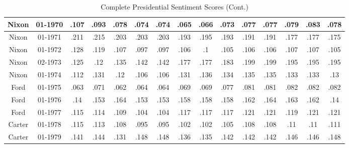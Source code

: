 \begin{sidewaystable}
\begin{singlespace}
\begin{center}
\begin{tabular}{||c c c c c c c c c c c c c c c||}
\hline
Nixon & 01-1970 & .107 & .093 & .078 & .074 & .074 & .065 & .066 & .073 & .077 & .077 & .079 & .083 & .078 \\ 
\hline
Nixon & 01-1971 & .211 & .215 & .203 & .203 & .203 & .193 & .195 & .193 & .191 & .191 & .177 & .177 & .175 \\ 
\hline
Nixon & 01-1972 & .128 & .119 & .107 & .097 & .097 & .106 & .1 & .105 & .106 & .106 & .107 & .107 & .105 \\ 
\hline
Nixon & 02-1973 & .125 & .12 & .135 & .142 & .142 & .177 & .177 & .183 & .199 & .199 & .195 & .195 & .195 \\ 
\hline
Nixon & 01-1974 & .112 & .131 & .12 & .106 & .106 & .131 & .136 & .134 & .135 & .135 & .133 & .133 & .13 \\ 
\hline
Ford & 01-1975 & .063 & .071 & .062 & .064 & .064 & .069 & .069 & .077 & .081 & .081 & .082 & .082 & .082 \\ 
\hline
Ford & 01-1976 & .14 & .153 & .164 & .153 & .153 & .158 & .158 & .158 & .162 & .164 & .163 & .162 & .14 \\ 
\hline
Ford & 01-1977 & .115 & .114 & .109 & .104 & .104 & .117 & .117 & .117 & .121 & .121 & .119 & .121 & .121 \\ 
\hline
Carter & 01-1978 & .115 & .113 & .108 & .095 & .095 & .102 & .102 & .105 & .108 & .108 & .11 & .11 & .111 \\ 
\hline
Carter & 01-1979 & .141 & .144 & .131 & .148 & .148 & .136 & .135 & .142 & .142 & .142 & .146 & .146 & .148 \\ 
\hline
 \hline
 \end{tabular}
\end{center}
\caption{Complete Presidential Sentiment Scores (Cont.)}
\label{appendix:sent8}
\end{singlespace}
\end{sidewaystable}

